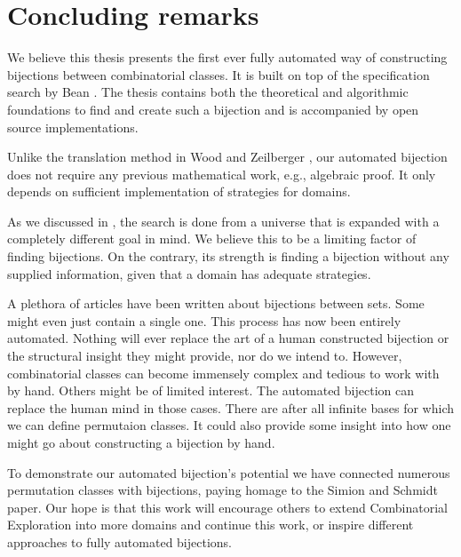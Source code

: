 \section{Concluding remarks}
We believe this thesis presents the first ever fully automated way of constructing bijections between combinatorial classes. It is built on top of the specification search by Bean \cite{BeanPhd:phd}. The thesis contains both the theoretical and algorithmic foundations to find and create such a bijection and is accompanied by open source implementations.

Unlike the translation method in Wood and Zeilberger \cite{wood_zeilberger}, our automated bijection does not require any previous mathematical work, e.g., algebraic proof. It only depends on sufficient implementation of strategies for domains.

As we discussed in , the search is done from a universe that is expanded with a completely different goal in mind. We believe this to be a limiting factor of finding bijections. On the contrary, its strength is finding a bijection without any supplied information, given that a domain has adequate strategies.

A plethora of articles have been written about bijections between sets. Some might even just contain a single one. This process has now been entirely automated. Nothing will ever replace the art of a human constructed bijection or the structural insight they might provide, nor do we intend to. However, combinatorial classes can become immensely complex and tedious to work with by hand. Others might be of limited interest. The automated bijection can replace the human mind in those cases. There are after all infinite bases for which we can define permutaion classes. It could also provide some insight into how one might go about constructing a bijection by hand.

To demonstrate our automated bijection's potential we have connected numerous permutation classes with bijections, paying homage to the Simion and Schmidt paper\cite{simionandschmidt}. Our hope is that this work will encourage others to extend Combinatorial Exploration into more domains and continue this work, or inspire different approaches to fully automated bijections.